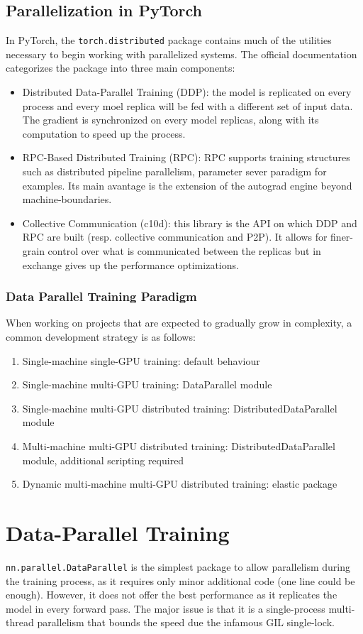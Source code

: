 \documentclass{article}
\begin{document}
\subsection{Parallelization in PyTorch}
In PyTorch, the \lstinline{torch.distributed} package contains much of the utilities necessary to begin working with parallelized systems. The official documentation categorizes the package into three main components:
\begin{itemize}
  \item Distributed Data-Parallel Training (DDP): the model is replicated on every process and every moel replica will be fed with a different set of input data. The gradient is synchronized on every model replicas, along with its computation to speed up the process.
  \item RPC-Based Distributed Training (RPC): RPC supports training structures such as distributed pipeline parallelism, parameter sever paradigm for examples. Its main avantage is the extension of the autograd engine beyond machine-boundaries.
  \item Collective Communication (c10d): this library is the API on which DDP and RPC are built (resp. collective communication and P2P). It allows for finer-grain control over what is communicated between the replicas but in exchange gives up the performance optimizations.
\end{itemize}

\subsubsection{Data Parallel Training Paradigm}
When working on projects that are expected to gradually grow in complexity, a common development strategy is as follows:
\begin{enumerate}
  \item Single-machine single-GPU training: default behaviour
  \item Single-machine multi-GPU training: DataParallel module
  \item Single-machine multi-GPU distributed training: DistributedDataParallel module
  \item Multi-machine multi-GPU distributed training: DistributedDataParallel module, additional scripting required
  \item Dynamic multi-machine multi-GPU distributed training: elastic package
\end{enumerate}

\section{Data-Parallel Training}
\lstinline{nn.parallel.DataParallel} is the simplest package to allow parallelism during the training process, as it requires only minor additional code (one line could be enough). However, it does not offer the best performance as it replicates the model in every forward pass. The major issue is that it is a single-process multi-thread parallelism that bounds the speed due the infamous \Gls{GIL} single-lock.
\end{document}
